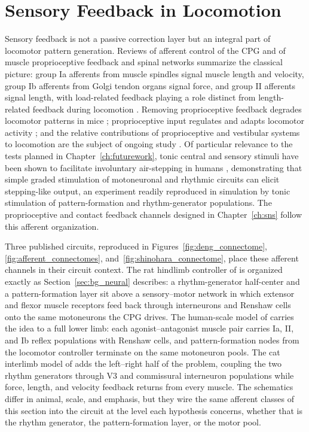 \section{Sensory Feedback in Locomotion}\label{sec:bg_sensory}

Sensory feedback is not a passive correction layer but an integral part of locomotor pattern generation. Reviews of afferent control of the CPG \citep{van_de_crommert_review_1998} and of muscle proprioceptive feedback and spinal networks \citep{windhorst_muscle_2007, windhorst_spinal_2022} summarize the classical picture: group Ia afferents from muscle spindles signal muscle length and velocity, group Ib afferents from Golgi tendon organs signal force, and group II afferents signal length, with load-related feedback playing a role distinct from length-related feedback during locomotion \citep{dietz_significance_2000}. Removing proprioceptive feedback degrades locomotor patterns in mice \citep{akay_degradation_2014}; proprioceptive input regulates and adapts locomotor activity \citep{lam_role_2002}; and the relative contributions of proprioceptive and vestibular systems to locomotion are the subject of ongoing study \citep{akay_relative_2021, akay_sensory_2020}. Of particular relevance to the tests planned in Chapter~\ref{ch:futurework}, tonic central and sensory stimuli have been shown to facilitate involuntary air-stepping in humans \citep{selionov_tonic_2009}, demonstrating that simple graded stimulation of motoneuronal and rhythmic circuits can elicit stepping-like output, an experiment readily reproduced in simulation by tonic stimulation of pattern-formation and rhythm-generator populations. The proprioceptive and contact feedback channels designed in Chapter~\ref{ch:sns} follow this afferent organization.

Three published circuits, reproduced in Figures~\ref{fig:deng_connectome}, \ref{fig:afferent_connectomes}, and~\ref{fig:shinohara_connectome}, place these afferent channels in their circuit context. The rat hindlimb controller of \citet{deng_neuromechanical_2019} is organized exactly as Section~\ref{sec:bg_neural} describes: a rhythm-generator half-center and a pattern-formation layer sit above a sensory--motor network in which extensor and flexor muscle receptors feed back through interneurons and Renshaw cells onto the same motoneurons the CPG drives. The human-scale model of \citet{dirusso_investigating_2023} carries the idea to a full lower limb: each agonist--antagonist muscle pair carries Ia, II, and Ib reflex populations with Renshaw cells, and pattern-formation nodes from the locomotor controller terminate on the same motoneuron pools. The cat interlimb model of \citet{shinohara_mechanisms_2025} adds the left--right half of the problem, coupling the two rhythm generators through V3 and commissural interneuron populations while force, length, and velocity feedback returns from every muscle. The schematics differ in animal, scale, and emphasis, but they wire the same afferent classes of this section into the circuit at the level each hypothesis concerns, whether that is the rhythm generator, the pattern-formation layer, or the motor pool.

